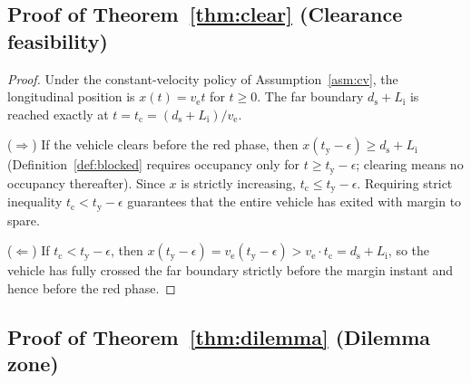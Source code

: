 \documentclass[conference, a4paper]{IEEEtran}
\theoremstyle{plain}
\newcommand{\ds}{d_{\mathrm{s}}}
\newcommand{\tclear}{t_{\mathrm{c}}}
\newcommand{\tred}{t_{\mathrm{y}}}
\newcommand{\Li}{L_{\mathrm{i}}}
\newcommand{\ve}{v_{\mathrm{e}}}
\begin{document}
\subsection{Proof of Theorem~\ref{thm:clear} (Clearance feasibility)}

\begin{proof}
Under the constant-velocity policy of Assumption~\ref{asm:cv}, the
longitudinal position is $x(t) = \ve t$ for $t \geq 0$. The far boundary
$\ds + \Li$ is reached exactly at $t = \tclear = (\ds + \Li)/\ve$.

($\Rightarrow$) If the vehicle clears before the red phase, then
$x(\tred - \epsilon) \geq \ds + \Li$ (Definition~\ref{def:blocked} requires
occupancy only for $t \geq \tred - \epsilon$; clearing means no occupancy
thereafter). Since $x$ is strictly increasing, $\tclear \leq \tred -
\epsilon$. Requiring strict inequality $\tclear < \tred - \epsilon$
guarantees that the entire vehicle has exited with margin to spare.

($\Leftarrow$) If $\tclear < \tred - \epsilon$, then
$x(\tred-\epsilon) = \ve(\tred-\epsilon) > \ve \cdot \tclear = \ds + \Li$,
so the vehicle has fully crossed the far boundary strictly before the margin
instant and hence before the red phase.
\end{proof}

\subsection{Proof of Theorem~\ref{thm:dilemma} (Dilemma zone)}
\end{document}
